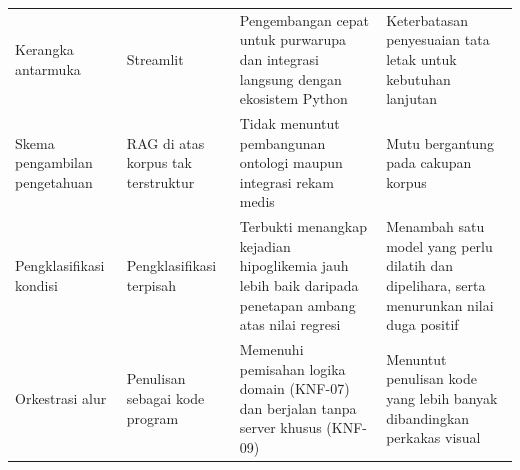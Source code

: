 \begin{longtable}{@{}p{2.5cm}p{2.7cm}p{3.8cm}p{3.6cm}@{}}
Kerangka antarmuka & Streamlit & Pengembangan cepat untuk purwarupa dan integrasi langsung dengan ekosistem Python & Keterbatasan penyesuaian tata letak untuk kebutuhan lanjutan \\[2pt]

Skema pengambilan pengetahuan & RAG di atas korpus tak terstruktur & Tidak menuntut pembangunan ontologi maupun integrasi rekam medis & Mutu bergantung pada cakupan korpus \\[2pt]

Pengklasifikasi kondisi & Pengklasifikasi terpisah & Terbukti menangkap kejadian hipoglikemia jauh lebih baik daripada penetapan ambang atas nilai regresi & Menambah satu model yang perlu dilatih dan dipelihara, serta menurunkan nilai duga positif \\[2pt]

Orkestrasi alur & Penulisan sebagai kode program & Memenuhi pemisahan logika domain (KNF-07) dan berjalan tanpa server khusus (KNF-09) & Menuntut penulisan kode yang lebih banyak dibandingkan perkakas visual \\

\end{longtable}
